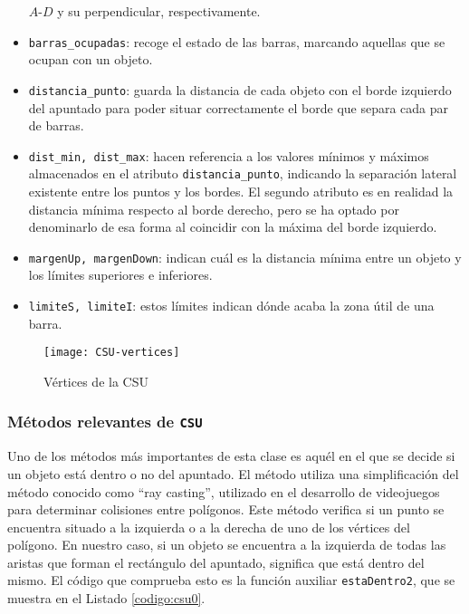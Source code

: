 \begin{itemize}
$A$-$D$ y su perpendicular, respectivamente.
\item \texttt{barras\_ocupadas}: recoge el estado de las barras, marcando
aquellas que se ocupan con un objeto.
\item \texttt{distancia\_punto}: guarda la distancia de cada objeto con el borde
izquierdo del apuntado para poder situar correctamente el borde que separa cada
par de barras.
\item \texttt{dist\_min, dist\_max}: hacen referencia a los valores mínimos y
máximos almacenados en el atributo \texttt{distancia\_punto}, indicando la separación lateral
existente entre los puntos y los bordes. El segundo atributo es en realidad la
distancia mínima respecto al borde derecho, pero se ha optado por denominarlo de
esa forma al coincidir con la máxima del borde izquierdo.
\item \texttt{margenUp, margenDown}: indican cuál es la distancia mínima entre
un objeto y los límites superiores e inferiores.
\item \texttt{limiteS, limiteI}: estos límites indican dónde acaba la zona útil
de una barra.
\end{itemize}

\begin{figure}
\centering
\texttt{[image: CSU-vertices]}
\caption{Vértices de la CSU}
\label{fig:vertices}
\end{figure}

\subsubsection{Métodos relevantes de \texttt{CSU}} \label{subsec:CSUmet}
Uno de los métodos más importantes de esta clase es aquél en el que se decide si
un objeto está dentro o no del apuntado. El método utiliza una simplificación 
del método conocido como ``ray casting'', utilizado en el desarrollo de
videojuegos para determinar colisiones entre polígonos. Este método verifica si
un punto se encuentra situado a la izquierda o a la derecha de uno de los
vértices del polígono. 
En nuestro caso, si un objeto se encuentra a la izquierda
de todas las aristas que forman el rectángulo del apuntado, significa que está
dentro del mismo. 
El código que comprueba esto es la función auxiliar
\texttt{estaDentro2}, que se muestra en el Listado \ref{codigo:csu0}.

